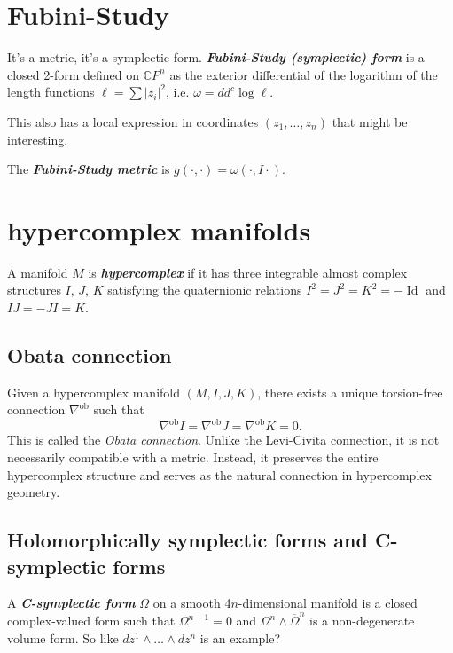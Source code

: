 \section{Fubini-Study}
It's a metric, it's a symplectic form. \textit{\textbf{Fubini-Study (symplectic) form}} is a closed 2-form defined on \(\mathbb{C}P^{n}\) as the exterior differential of the logarithm of the length functions \(\ell=\sum |z_i|^2\), i.e. \(\omega=dd^c \operatorname{log} \ell\).

This also has a local expression in coordinates \((z_1,\ldots,z_n)\) that might be interesting.

The \textit{\textbf{Fubini-Study metric}} is \(g(\cdot ,\cdot )=\omega(\cdot ,I\cdot )\).

\section{hypercomplex manifolds}

\begin{defn}\leavevmode
	A manifold $M$ is \textit{\textbf{hypercomplex}} if it has three integrable almost complex structures  $I$,  $J$, $K$ satisfying the quaternionic relations $I^2=J^2=K^2=-\operatorname{Id}$ and $I J=-J I=K$.
\end{defn}

\subsection{Obata connection}

\begin{remark}
    Given a hypercomplex manifold $(M, I, J, K)$, there exists a unique torsion-free connection $\nabla^{\operatorname{ob}}$ such that
    \[
    \nabla^{\operatorname{ob}} I = \nabla^{\operatorname{ob}} J = \nabla^{\operatorname{ob}} K = 0.
    \]
    This is called the \textit{Obata connection}. Unlike the Levi-Civita connection, it is not necessarily compatible with a metric. Instead, it preserves the entire hypercomplex structure and serves as the natural connection in hypercomplex geometry.
\end{remark}

\subsection{Holomorphically symplectic forms and C-symplectic forms}

A \textit{\textbf{C-symplectic form}} \(\Omega\) on a smooth 4\(n\)-dimensional manifold is a closed complex-valued form such that \(\Omega^{n+1}=0\) and \(\Omega^n \wedge \overline{ \Omega}^n\) is a non-degenerate volume form. So like \(dz^1 \wedge \ldots \wedge dz^n\) is an example?

